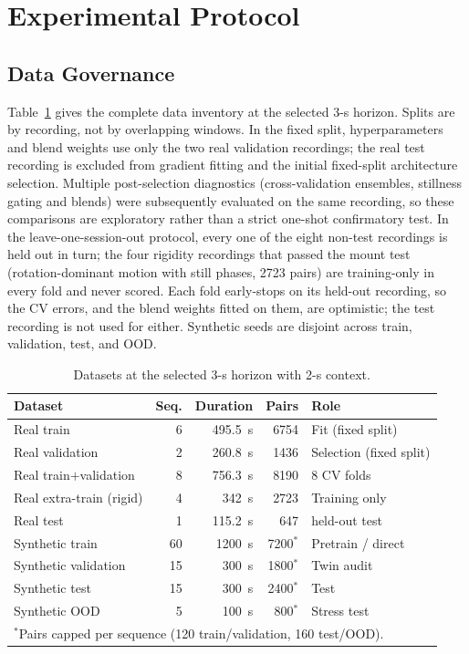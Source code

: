 \section{Experimental Protocol}
\label{sec:experiments}

\subsection{Data Governance}
Table~\ref{tab:data} gives the complete data inventory at the selected 3-s
horizon. Splits are by recording, not by overlapping windows. In the fixed
split, hyperparameters and blend weights use only the two real validation
recordings; the real test recording is excluded from gradient fitting and the
initial fixed-split architecture selection. Multiple post-selection
diagnostics (cross-validation ensembles, stillness gating and blends) were
subsequently evaluated on the same recording, so these comparisons are
exploratory rather than a strict one-shot confirmatory test. In the
leave-one-session-out protocol, every one of the eight non-test recordings is
held out in turn; the four rigidity recordings that passed the mount test
(rotation-dominant motion with still phases, 2723 pairs) are training-only
in every fold and never scored. Each fold early-stops on its held-out
recording, so the CV errors, and the blend weights fitted on them, are
optimistic; the test recording is not used for either. Synthetic seeds are disjoint across train,
validation, test, and OOD.

\begin{table}[t]
\centering
\caption{Datasets at the selected 3-s horizon with 2-s context.}
\label{tab:data}
\footnotesize
\setlength{\tabcolsep}{4pt}
\begin{tabular}{lrrrl}
\toprule
Dataset & Seq. & Duration & Pairs & Role \\
\midrule
Real train & 6 & 495.5~s & 6754 & Fit (fixed split) \\
Real validation & 2 & 260.8~s & 1436 & Selection (fixed split) \\
Real train$+$validation & 8 & 756.3~s & 8190 & 8 CV folds \\
Real extra-train (rigid) & 4 & 342~s & 2723 & Training only \\
Real test & 1 & 115.2~s & 647 & held-out test \\
Synthetic train & 60 & 1200~s & 7200$^\ast$ & Pretrain / direct \\
Synthetic validation & 15 & 300~s & 1800$^\ast$ & Twin audit \\
Synthetic test & 15 & 300~s & 2400$^\ast$ & Test \\
Synthetic OOD & 5 & 100~s & 800$^\ast$ & Stress test \\
\bottomrule
\multicolumn{5}{l}{$^\ast$Pairs capped per sequence (120 train/validation, 160 test/OOD).}
\end{tabular}
\end{table}

